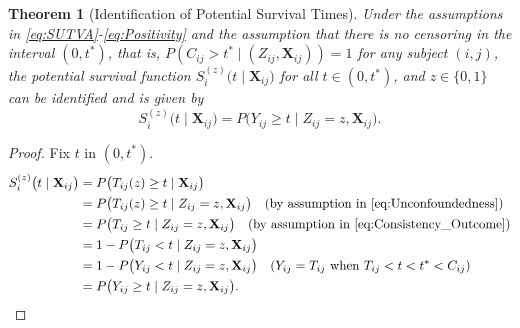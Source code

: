 \documentclass[aoas]{imsart}
\theoremstyle{plain}
\newtheorem{theorem}{Theorem}[section]
\theoremstyle{definition}
\begin{document}







\begin{theorem}[Identification of Potential Survival Times]
Under the assumptions in \eqref{eq:SUTVA}-\eqref{eq:Positivity} and the assumption that there is no censoring in the interval $(0,t^*)$, that is, $P(C_{ij}>t^* \mid (Z_{ij},\mathbf{X}_{ij}))=1$ for any subject $(i,j)$, the potential survival function $S_i^{(z)}\bigl(t \mid \mathbf{X}_{ij}\bigr)$ for all $t \in (0,t^*)$, and $z \in \{0,1\}$ can be identified and is given by
\begin{equation}
\nonumber
S_i^{(z)}\bigl(t \mid \mathbf{X}_{ij}\bigr)
= P\bigl(Y_{ij}\ge t \mid Z_{ij}=z,\mathbf{X}_{ij}\bigr).
\end{equation}
\noindent


\end{theorem}
\begin{proof}
Fix $t$ in $(0,t^*)$.
\[
\begin{aligned}
S_i^{(z)}\bigl(t\mid \mathbf{X}_{ij}\bigr) 
&= P\bigl(T_{ij}(z)\ge t \mid \mathbf{X}_{ij}\bigr) \\
&= P\bigl(T_{ij}(z)\ge t \mid Z_{ij}=z,\mathbf{X}_{ij}\bigr)  \quad (\text{by assumption in \eqref{eq:Unconfoundedness}}) \\
&= P\bigl(T_{ij}\ge t \mid Z_{ij}=z,\mathbf{X}_{ij}\bigr) \quad (\text{by assumption in \eqref{eq:Consistency_Outcome}}) \\
&= 1-P\bigl(T_{ij} < t \mid Z_{ij}=z,\mathbf{X}_{ij}\bigr) \\
&=1- P\bigl(Y_{ij} < t \mid Z_{ij}=z,\mathbf{X}_{ij}\bigr) \quad (\text{$Y_{ij}=T_{ij}$ when $T_{ij} < t < t^* <C_{ij}$}) \\
&= P\bigl(Y_{ij} \ge t \mid Z_{ij}=z,\mathbf{X}_{ij}\bigr).
\end{aligned}
\]
\end{proof}
\end{document}
